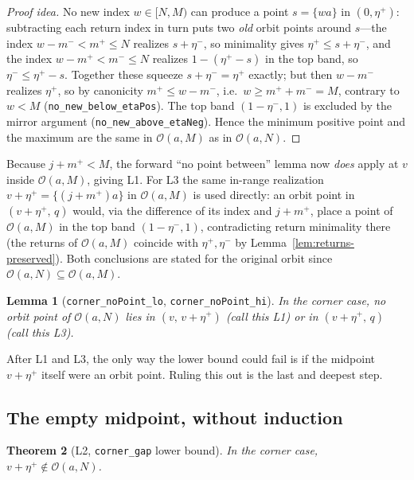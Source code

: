 \documentclass[11pt,reqno]{amsart}
\theoremstyle{plain}
\newtheorem{theorem}{Theorem}[section]
\newtheorem{lemma}[theorem]{Lemma}
\theoremstyle{definition}
\theoremstyle{remark}
\newcommand{\fract}[1]{\{#1\}}
\newcommand{\etap}{\eta^{+}}
\newcommand{\etam}{\eta^{-}}
\newcommand{\mpl}{m^{+}}
\newcommand{\mmi}{m^{-}}
\newcommand{\orb}{\mathcal{O}}
\newcommand{\code}[1]{\texttt{#1}}
\begin{document}
\begin{proof}[Proof idea]
No new index $w\in[N,M)$ can produce a point $s=\fract{w a}$ in $(0,\etap)$:
subtracting each return index in turn puts two \emph{old} orbit points around
$s$---the index $w-\mmi<\mpl\le N$ realizes $s+\etam$, so minimality gives
$\etap\le s+\etam$, and the index $w-\mpl<\mmi\le N$ realizes $1-(\etap-s)$ in
the top band, so $\etam\le\etap-s$.  Together these squeeze $s+\etam=\etap$
exactly; but then $w-\mmi$ realizes $\etap$, so by canonicity $\mpl\le w-\mmi$,
i.e.\ $w\ge\mpl+\mmi=M$, contrary to $w<M$ (\code{no\_new\_below\_etaPos}).
The top band $(1-\etam,1)$ is excluded by the mirror argument
(\code{no\_new\_above\_etaNeg}).  Hence the minimum positive point and the
maximum are the same in $\orb(a,M)$ as in $\orb(a,N)$.
\end{proof}

Because $j+\mpl<M$, the forward ``no point between'' lemma now \emph{does} apply
at $v$ inside $\orb(a,M)$, giving L1.  For L3 the same in-range realization
$v+\etap=\fract{(j+\mpl)a}$ in $\orb(a,M)$ is used directly: an orbit point in
$(v+\etap,\,q)$ would, via the difference of its index and $j+\mpl$, place a
point of $\orb(a,M)$ in the top band $(1-\etam,1)$, contradicting return
minimality there (the returns of $\orb(a,M)$ coincide with $\etap,\etam$ by
Lemma~\ref{lem:returns-preserved}).  Both conclusions are stated for the
original orbit since $\orb(a,N)\subseteq\orb(a,M)$.

\begin{lemma}[\code{corner\_noPoint\_lo}, \code{corner\_noPoint\_hi}]
\label{lem:L1L3}
In the corner case, no orbit point of $\orb(a,N)$ lies in $(v,\,v+\etap)$
(call this L1) or in $(v+\etap,\,q)$ (call this L3).
\end{lemma}

After L1 and L3, the only way the lower bound could fail is if the midpoint
$v+\etap$ itself were an orbit point.  Ruling this out is the last and deepest
step.

\subsection{The empty midpoint, without induction}

\begin{theorem}[L2, \code{corner\_gap} lower bound]\label{thm:L2}
In the corner case, $v+\etap\notin\orb(a,N)$.
\end{theorem}
\end{document}
